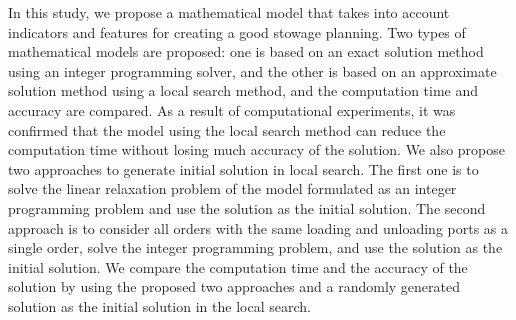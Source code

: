 In this study, we propose a mathematical model that takes into account indicators and features for creating a good stowage planning. Two types of mathematical models are proposed: one is based on an exact solution method using an integer programming solver, and the other is based on an approximate solution method using a local search method, and the computation time and accuracy are compared. As a result of computational experiments, it was confirmed that the model using the local search method can reduce the computation time without losing much accuracy of the solution. We also propose two approaches to generate initial solution in local search. The first one is to solve the linear relaxation problem of the model formulated as an integer programming problem and use the solution as the initial solution. The second approach is to consider all orders with the same loading and unloading ports as a single order, solve the integer programming problem, and use the solution as the initial solution. We compare the computation time and the accuracy of the solution by using the proposed two approaches and a randomly generated solution as the initial solution in the local search.
